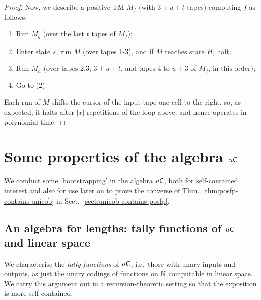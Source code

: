 \documentclass{lmcs}
\begin{document}
\begin{proof}
Now, we describe a positive TM $M_f$ (with $3+u+t$ tapes) computing $f$ as follows:
\begin{enumerate}
\item
Run $M_g$ (over the last $t$ tapes of $M_f$);
\item
Enter state $s$, run $M$ (over tapes 1-3), and if $M$ reaches state $H$, halt;
\item
Run $M_h$ (over tapes $2$,$3$, $3+u+t$, and tapes $4$ to $u+3$ of $M_f$, in this order);
\item
Go to (2).
\end{enumerate}

\noindent
Each run of $M$ shifts the cursor of the input tape one cell to the right, so, as expected, it halts after $|x|$ repetitions of the loop above, and hence operates in polynomial time. 
\end{proof}





\section{Some properties of the algebra $u \mathsf{C}$}
\label{sect:props-unicob}
We conduct some `bootstrapping' in the algebra $u \mathsf{C}$, both for self-contained interest and also for use later on to prove the converse of Thm.~\ref{thm:posfp-contains-unicob} in Sect.~\ref{sect:unicob-contains-posfp}.



\subsection{An algebra for lengths: tally functions of $u \mathsf{C}$ and linear space}
We characterise the \emph{tally functions} of $u \mathsf{C}$, i.e.\ those with unary inputs and outputs, as just the unary codings of functions on $\mathbb{N}$ computable in linear space.
We carry this argument out in a recursion-theoretic setting so that the exposition is more self-contained.
\end{document}
